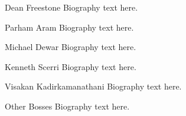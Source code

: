 \documentclass[journal]{IEEEtran}
\begin{document}
\ifCLASSOPTIONcaptionsoff
  \newpage
\fi








%

\begin{IEEEbiography}{Dean Freestone}
Biography text here.
\end{IEEEbiography}

\begin{IEEEbiography}{Parham Aram}
Biography text here.
\end{IEEEbiography}


\begin{IEEEbiography}{Michael Dewar}
Biography text here.
\end{IEEEbiography}

\begin{IEEEbiography}{Kenneth Scerri}
Biography text here.
\end{IEEEbiography}

\begin{IEEEbiography}{Visakan Kadirkamanathani}
Biography text here.
\end{IEEEbiography}

\begin{IEEEbiography}{Other Bosses}
Biography text here.
\end{IEEEbiography}

\end{document}
